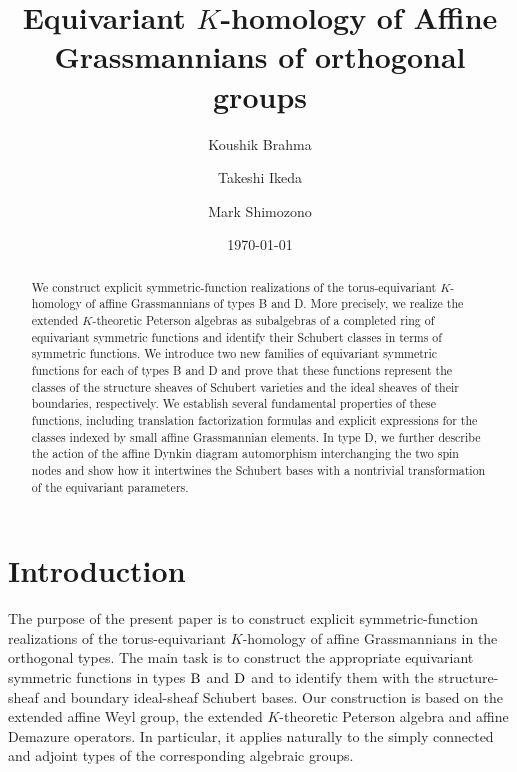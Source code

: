 \documentclass[a4paper]{amsart}
\title[Equivariant $K$-homology of Affine Grassmannians]{Equivariant $K$-homology of Affine Grassmannians of orthogonal groups}
\author[K. Brahma]{Koushik Brahma}
\author[T. Ikeda]{Takeshi Ikeda}
\author[M. Shimozono]{Mark Shimozono}
\date{\today}
\theoremstyle{remark}
\numberwithin{equation}{section}
\begin{document}

\begin{abstract}
  We construct explicit symmetric-function realizations of the torus-equivariant $K$-homology of affine Grassmannians of types B and D. More precisely, we realize the extended $K$-theoretic Peterson algebras as subalgebras of a completed ring of equivariant symmetric functions and identify their Schubert classes in terms of symmetric functions. We introduce two new families of equivariant symmetric functions for each of types B and D and prove that these functions represent the classes of the structure sheaves of Schubert varieties and the ideal sheaves of their boundaries, respectively.
  We establish several fundamental properties of these functions, including translation factorization formulas and explicit expressions for the classes indexed by small affine Grassmannian elements. In type D, we further describe the action of { the affine Dynkin diagram automorphism interchanging the two spin nodes} and show how it intertwines the Schubert bases with a nontrivial transformation of the equivariant parameters. 
\end{abstract}




\maketitle






\section{Introduction}

The purpose of the present paper is to construct explicit symmetric-function realizations of the torus-equivariant \(K\)-homology of affine Grassmannians in the orthogonal types. The main task is to construct the appropriate equivariant symmetric functions in types $\mathrm{B}_{}$ and $\mathrm{D}_{}$ and
to identify them with the structure-sheaf and boundary ideal-sheaf Schubert bases. Our construction is based on the extended affine Weyl group, the extended $K$-theoretic Peterson algebra and affine Demazure operators. In particular, it applies naturally to the simply connected and adjoint types of the corresponding algebraic groups.
\end{document}
